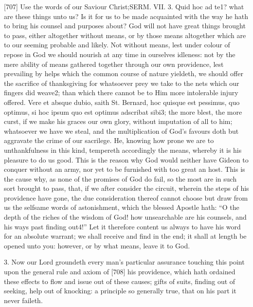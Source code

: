 [707]
Use the words of our Saviour Christ;SERM. VII. 3. Quid hoc ad te1? what are these things unto us? Is it for us to be made acquainted with the way he hath to bring his counsel and purposes about? God will not have great things brought to pass, either altogether without means, or by those means altogether which are to our seeming probable and likely. Not without means, lest under colour of repose in God we should nourish at any time in ourselves idleness: not by the mere ability of means gathered together through our own providence, lest prevailing by helps which the common course of nature yieldeth, we should offer the sacrifice of thanksgiving for whatsoever prey we take to the nets which our fingers did weave2; than which there cannot be to Him more intolerable injury offered. Vere et absque dubio, saith St. Bernard, hoc quisque est pessimus, quo optimus, si hoc ipsum quo est optimus adscribat sibi3; the more blest, the more curst, if we make his graces our own glory, without imputation of all to him; whatsoever we have we steal, and the multiplication of God’s favours doth but aggravate the crime of our sacrilege. He, knowing how prone we are to unthankfulness in this kind, tempereth accordingly the means, whereby it is his pleasure to do us good. This is the reason why God would neither have Gideon to conquer without an army, nor yet to be furnished with too great an host. This is the cause why, as none of the promises of God do fail, so the most are in such sort brought to pass, that, if we after consider the circuit, wherein the steps of his providence have gone, the due consideration thereof cannot choose but draw from us the selfsame words of astonishment, which the blessed Apostle hath: “O the depth of the riches of the wisdom of God! how unsearchable are his counsels, and his ways past finding out4!” Let it therefore content us always to have his word for an absolute warrant; we shall receive and find in the end; it shall at length be opened unto you: however, or by what means, leave it to God.

3. Now our Lord groundeth every man’s particular assurance touching this point upon the general rule and axiom of [708] his providence, which hath ordained these effects to flow and issue out of these causes; gifts of suits, finding out of seeking, help out of knocking: a principle so generally true, that on his part it never faileth.

